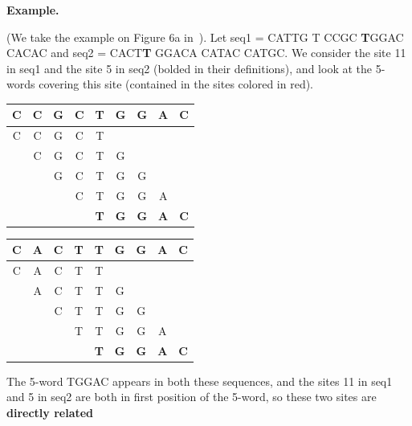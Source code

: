 \documentclass[english,13pt,a4paper]{article}
\theoremstyle{definition}
\newtheorem*{example}{Example}
\theoremstyle{remark}
\theoremstyle{defstyle}
\renewenvironment{example}[1][]{
    \par\noindent\textbf{Example.}%
    \begin{mdframed}[
        linewidth=.8pt,
        linecolor=darkgray,
        bottomline=false,
        topline=false,
        rightline=false,
        innerrightmargin=0pt,
        innertopmargin=0pt,
        innerbottommargin=0pt,
        innerleftmargin=1em,%
        skipabove=.5\baselineskip
    ]}
    {\end{mdframed}}
\begin{document}
\begin{example}
    (We take the example on Figure 6a in~\cite{didier_comparing_2007}). Let seq1 = CATTG T{\color{red} CCGC \textbf{T}GGAC} CACAC and seq2 = {\color{red} CACT\textbf{T} GGAC}A CATAC CATGC. We consider the site 11 in seq1 and the site 5 in seq2 (bolded in their definitions), and look at the 5-words covering this site (contained in the sites colored in red).\\

    \begin{minipage}{.47\textwidth}
        \begin{tabular}{*4c | c | *4c}
            \cline{5-5}
            C & C & G & C & \textbf{T} & G & G & A & C \\
            \hline
            C & C & G & C & T &   &   &   &  \\
              & C & G & C & T & G &   &   &  \\
              &   & G & C & T & G & G &   &  \\
              &   &   & C & T & G & G & A &  \\
              &   &   &   & \textbf{T} & \textbf{G} & \textbf{G} & \textbf{A} & \textbf{C} \\
            \cline{5-5}
        \end{tabular}
    \end{minipage}
    \begin{minipage}{.47\textwidth}
        \begin{tabular}{*4c | c | *4c}
            \cline{5-5}
            C & A & C & T & \textbf{T} & G & G & A & C \\
            \hline
            C & A & C & T & T &   &   &   &  \\
              & A & C & T & T & G &   &   &  \\
              &   & C & T & T & G & G &   &  \\
              &   &   & T & T & G & G & A &  \\
              &   &   &   & \textbf{T} & \textbf{G} & \textbf{G} & \textbf{A} & \textbf{C} \\
            \cline{5-5}
        \end{tabular}
    \end{minipage}

    \noindent
    The 5-word TGGAC appears in both these sequences, and the sites 11 in seq1 and 5 in seq2 are both in first position of the 5-word, so these two sites are \textbf{directly related}
\end{example}
\end{document}
